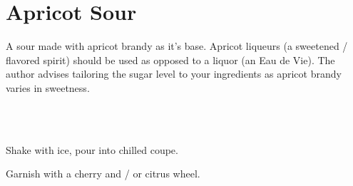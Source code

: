 \section[Apricot Sour]{Apricot Sour}


\begin{recipestats}[
	servings=1,
	preptime=5~\minute,
	source=\citeauthor{cocktailPartyApricotSour}~\cite{cocktailPartyApricotSour},
	original=\citeauthor{joyOfMixologyRegan}~\cite{joyOfMixologyRegan},
]
\end{recipestats}




\begin{recipeabstract}
	A sour made with apricot brandy as it's base.
	Apricot liqueurs (a sweetened / flavored spirit) should be used as opposed to a liquor (an Eau de Vie)\cite{cocktailPartyApricotSour}\cite{joyOfMixologyRegan}.
	The author advises tailoring the sugar level to your ingredients as apricot brandy varies in sweetness\cite{cocktailPartyApricotSour}.
\end{recipeabstract}




\begin{ingredientcolumns}[1]
	\begin{ingredientblock}
		\\
		\\
	\end{ingredientblock}
\end{ingredientcolumns}


\begin{preparation}
	\item Shake with ice, pour into chilled coupe.
	\item Garnish with a cherry and / or citrus wheel.
\end{preparation}


\recipeend%
